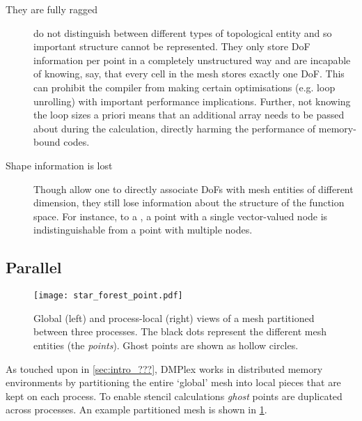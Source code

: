 \documentclass[thesis]{subfiles}
\begin{document}
\begin{description}
  \item[They are fully ragged]
     do not distinguish between different types of topological entity and so important structure cannot be represented.
    They only store DoF information per point in a completely unstructured way and are incapable of knowing, say, that every cell in the mesh stores exactly one DoF.
    This can prohibit the compiler from making certain optimisations (e.g. loop unrolling) with important performance implications.
    Further, not knowing the loop sizes a priori means that an additional array needs to be passed about during the calculation, directly harming the performance of memory-bound codes.

  \item[Shape information is lost]
    Though  allow one to directly associate DoFs with mesh entities of different dimension, they still lose information about the structure of the function space.
    For instance, to a , a point with a single vector-valued node is indistinguishable from a point with multiple nodes.
\end{description}

\subsection{Parallel}
\label{sec:dmplex_parallel}

\begin{figure}
  \centering
  \texttt{[image: star\_forest\_point.pdf]}
  \caption{
    Global (left) and process-local (right) views of a mesh partitioned between three processes.
    The black dots represent the different mesh entities (the \emph{points}).
    Ghost points are shown as hollow circles.
  }
  \label{fig:dmplex_split_mesh}
\end{figure}

As touched upon in \cref{sec:intro_???}, DMPlex works in distributed memory environments by partitioning the entire `global' mesh into local pieces that are kept on each process.
To enable stencil calculations \emph{ghost} points are duplicated across processes.
An example partitioned mesh is shown in \cref{fig:dmplex_split_mesh}.
\end{document}
